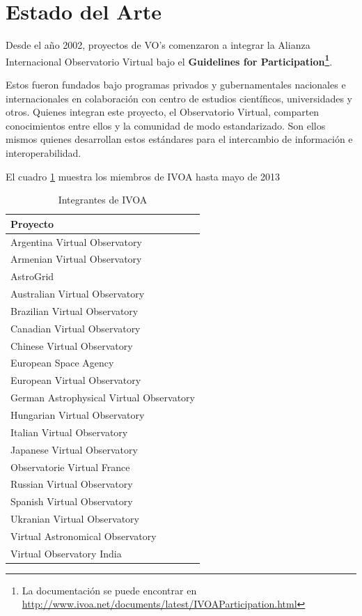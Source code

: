 \section{Estado del Arte}

Desde el año 2002, proyectos de VO's comenzaron a integrar
la Alianza Internacional Observatorio Virtual bajo el \textbf{Guidelines
for Participation\footnote{La documentación se puede
encontrar en \url{http://www.ivoa.net/documents/latest/IVOAParticipation.html}}}.

Estos fueron fundados bajo programas privados y gubernamentales nacionales e
internacionales en colaboración con centro de estudios científicos,
universidades y otros. Quienes integran este proyecto, el Observatorio Virtual, 
comparten conocimientos entre ellos y la comunidad de modo estandarizado. Son 
ellos mismos quienes desarrollan estos estándares para el intercambio de 
información e interoperabilidad.

El cuadro \ref{table:integrantes} muestra los miembros de IVOA hasta mayo de
2013

\begin{table}[h!t]
	\centering
	\begin{tabular}{l} \hline
		\textbf{Proyecto} \\\hline
			Argentina Virtual Observatory\cite{arg} \\
			Armenian Virtual Observatory\cite{arm}\\
			AstroGrid\cite{astrogrid}\\
			Australian Virtual Observatory\cite{aus}\\
			Brazilian Virtual Observatory\cite{bra}\\
			Canadian Virtual Observatory\cite{can}\\
			Chinese Virtual Observatory\cite{china}\\
			European Space Agency\cite{esa}\\
			European Virtual Observatory\cite{euro}\\
			German Astrophysical Virtual Observatory\cite{ger}\\
			Hungarian Virtual Observatory\cite{hun}\\
			Italian Virtual Observatory\cite{ita}\\
			Japanese Virtual Observatory\cite{jap}\\
			Observatorie Virtual France\cite{fra}\\
			Russian Virtual Observatory\cite{rus}\\
			Spanish Virtual Observatory\cite{spa}\\
			Ukranian Virtual Observatory\cite{ukr}\\
			Virtual Astronomical Observatory\cite{usa}\\
			Virtual Observatory India\cite{ind}\\
            \hline
	\end{tabular}
	\caption{Integrantes de IVOA}
	\label{table:integrantes}
\end{table}

